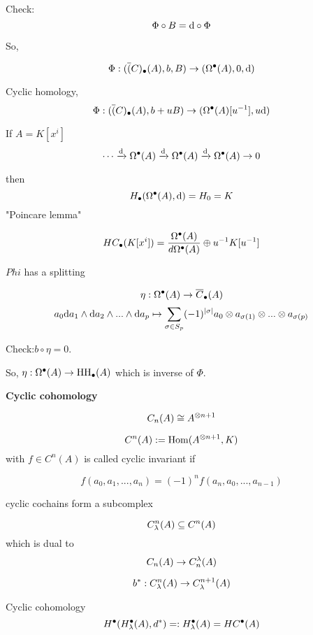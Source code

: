 Check:
$$\Phi\circ B=\mathrm{d}\circ\Phi$$

So,

$$\Phi:(\overline(C)_{\bullet}(A),b,B)\to(\Omega^{\bullet}(A),0,\mathrm{d})$$

Cyclic homology,
$$\Phi:(\overline(C)_{\bullet}(A),b+uB)\to
(\Omega^{\bullet}(A)[u^{-1}],u\mathrm{d} )$$


If $A=K[x^i]$
$$\cdots\xrightarrow{\mathrm{d}}\Omega^{\bullet}(A)
\xrightarrow{\mathrm{d}}\Omega^{\bullet}(A)\xrightarrow{\mathrm{d}}\Omega^{\bullet}(A)\to 0$$

then $$H_{\bullet}(\Omega^{\bullet}(A),\mathrm{d})=H_0=K$$
"Poincare lemma"

\begin{prop}
$$HC_{\bullet}(K[x^i])=\frac{\Omega^{\bullet}(A)}
                    {d\Omega^{\bullet}(A)}
\oplus u^{-1}K[u^{-1}]$$


\end{prop}

\begin{rem}

$Phi$ has a splitting

$$\eta:\Omega^{\bullet}(A)\to\overline{C}_{\bullet}(A)$$
$$a_0\mathrm{d} a_1\wedge\mathrm{d} a_2\wedge...\wedge\mathrm{d} a_p
\mapsto\sum_{\sigma\in S_p}(-1)^{|\sigma|}a_0\otimes a_{\sigma(1)}\otimes...\otimes a_{\sigma(p)}$$

Check:$b\circ\eta=0$.

So, $\eta:\Omega^{\bullet}(A)\to \operatorname{HH}_{\bullet}(A)$
which is inverse of $\Phi$.
\end{rem}

\textbf{Cyclic cohomology }

$$C_n(A)\cong A^{\otimes n+1}$$

\begin{definition}
$$C^n(A):=\operatorname{Hom}(A^{\otimes n+1},K)$$
with $f\in C^n(A)$ is called cyclic invariant if

$$f(a_0,a_1,...,a_n)=(-1)^nf(a_n,a_0,...,a_{n-1})$$

cyclic cochains form a subcomplex

$$C_{\lambda}^n(A)\subseteq C^n(A)$$
which is dual to
$$C_n(A)\to C_n^{\lambda}(A)$$

$$b^*:C_{\lambda}^n(A)\to C_{\lambda}^{n+1}(A)$$



\end{definition}

\begin{definition}
Cyclic cohomology
$$H^{\bullet}(H_{\lambda}^{\bullet}(A),d^*)=:H^{\bullet}_{\lambda}(A)=HC^{\bullet}(A)$$

\end{definition}

